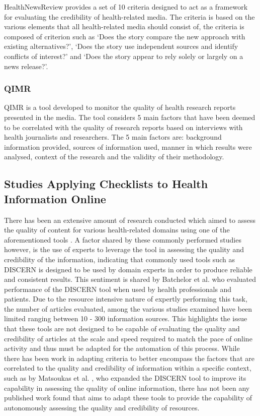 \documentclass[a4paper,twoside,phd]{BYUPhys}
\begin{document}
HealthNewsReview \cite{HealthNewsReview} provides a set of 10 criteria designed to act as a framework for evaluating the credibility of health-related media. The criteria is based on the various elements that all health-related media should consist of, the criteria is composed of criterion such as `Does the story compare the new approach with existing alternatives?', `Does the story use independent sources and identify conflicts of interest?' and `Does the story appear to rely solely or largely on a news release?'.

\subsubsection{QIMR}
\label{sec:QIMR}

QIMR \cite{QIMR} is a tool developed to monitor the quality of health research reports presented in the media. The tool considers 5 main factors that have been deemed to be correlated with the quality of research reports based on interviews with health journalists and researchers. The 5 main factors are: background information provided, sources of information used, manner in which results were analysed, context of the research and the validity of their methodology.

\subsection{Studies Applying Checklists to Health Information Online}
\label{sec:ChecklistStudies}

There has been an extensive amount of research conducted which aimed to assess the quality of content for various health-related domains using one of the aforementioned tools \cite{CanteyBanasiak2017} \cite{Cipriani} \cite{Kaicker2010} \cite{Som2012}. A factor shared by these commonly performed studies however, is the use of experts to leverage the tool in assessing the quality and credibility of the information, indicating that commonly used tools such as DISCERN is designed to be used by domain experts in order to produce reliable and consistent results. This sentiment is shared by Batchelor et al. \cite{Batchelor2009} who evaluated performance of the DISCERN tool when used by health professionals and patients. Due to the resource intensive nature of expertly performing this task, the number of articles evaluated, among the various studies examined have been limited ranging between 10 - 300 information sources. This highlights the issue that these tools are not designed to be capable of evaluating the quality and credibility of articles at the scale and speed required to match the pace of online activity and thus must be adapted for the automation of this process. While there has been work in adapting criteria to better encompass the factors that are correlated to the quality and credibility of information within a specific context, such as by Matsoukas et al. \cite{Matsoukas2008}, who expanded the DISCERN tool to improve its capability in assessing the quality of online information, there has not been any published work found that aims to adapt these tools to provide the capability of autonomously assessing the quality and credibility of resources.
\end{document}
